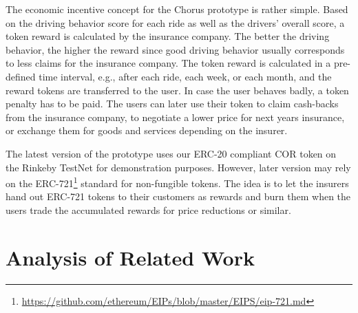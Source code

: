 \documentclass{llncs}
\begin{document}
{			The economic incentive concept for the Chorus prototype is rather simple. Based on the driving behavior score for each ride as well as the drivers' overall score, a token reward is calculated by the insurance company. The better the driving behavior, the higher the reward since good driving behavior usually corresponds to less claims for the insurance company. The token reward is calculated in a pre-defined time interval, e.g., after each ride, each week, or each month, and the reward tokens are transferred to the user. In case the user behaves badly, a token penalty has to be paid. The users can later use their token to claim cash-backs from the insurance company, to negotiate a lower price for next years insurance, or exchange them for goods and services depending on the insurer.
			
			The latest version of the prototype uses our ERC-20 compliant COR token on the Rinkeby TestNet for demonstration purposes. However, later version may rely on the ERC-721\footnote{\url{https://github.com/ethereum/EIPs/blob/master/EIPS/eip-721.md}} standard for non-fungible tokens. The idea is to let the insurers hand out ERC-721 tokens to their customers as rewards and burn them when the users trade the accumulated rewards for price reductions or similar.
			

					
		
%
%			
					


	\section{Analysis of Related Work}
		\label{s:section-7}	
		

}
\end{document}

